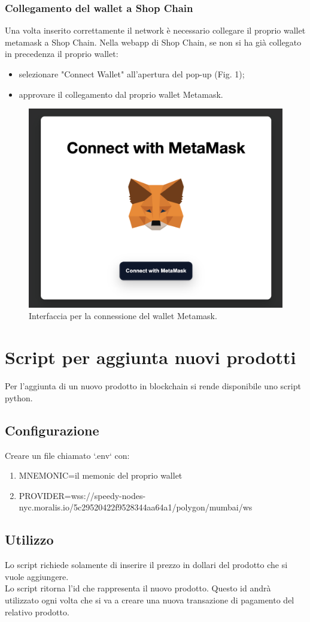 \documentclass[a4paper, 12pt]{article}
\begin{document}
\subsubsection{Collegamento del wallet a Shop Chain}
Una volta inserito correttamente il network è necessario collegare il proprio wallet metamask a Shop Chain. Nella webapp di Shop Chain, se non si ha già collegato in precedenza il proprio wallet:
\begin {itemize}
\item selezionare "Connect Wallet" all'apertura del pop-up (Fig. 1);
\item approvare il collegamento dal proprio wallet Metamask.
\end{itemize}

\FloatBarrier
\begin{figure}
\centering
\includegraphics[width=0.5\linewidth]{img/connessione_wallet.png}
\caption{Interfaccia per la connessione del wallet Metamask.}
\end{figure}
\FloatBarrier

\section{Script per aggiunta nuovi prodotti}
Per l'aggiunta di un nuovo prodotto in blockchain si rende disponibile uno script python.
\subsection{Configurazione}
Creare un file chiamato `.env` con:
\begin{enumerate}
    \item 
MNEMONIC=il memonic del proprio wallet
\item 
PROVIDER=wss://speedy-nodes-nyc.moralis.io/5c29520422f9528344aa64a1/polygon/mumbai/ws
\end{enumerate}

\subsection{Utilizzo}
Lo script richiede solamente di inserire il prezzo in dollari del prodotto che si vuole aggiungere.\\
Lo script ritorna l'id che rappresenta il nuovo prodotto. Questo id andrà utilizzato ogni volta che si va a creare una nuova transazione di pagamento del relativo prodotto.
\end{document}
